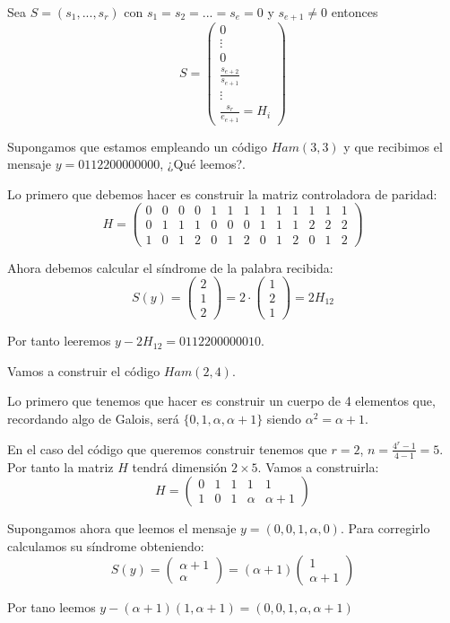 \obs Sea $S=(s_1,...,s_r)$ con $s_1=s_2=...=s_e=0$ y $s_{e+1} \neq 0$ entonces
\[S = \left( \begin{array}{c} 0 \\ \vdots \\ 0 \\ \frac{s_{e+2}}{s_{e+1}} \\ \vdots \\ \frac{s_{r}}{e_{e+1}}=H_i\end{array}\right)\]

\begin{example}
Supongamos que estamos empleando un código $Ham(3,3)$ y que recibimos el mensaje $y=0112200000000$, ¿Qué leemos?.

Lo primero que debemos hacer es construir la matriz controladora de paridad:
\[H = \left(\begin{array}{ccccccccccccc}
0 & 0 & 0 & 0 & 1 & 1 & 1 & 1 & 1 & 1 & 1 & 1 & 1\\
0 & 1 & 1 & 1 & 0 & 0 & 0 & 1 & 1 & 1 & 2 & 2 & 2\\
1 & 0 & 1 & 2 & 0 & 1 & 2 & 0 & 1 & 2 & 0 & 1 & 2
\end{array}\right)\]

Ahora debemos calcular el síndrome de la palabra recibida:
\[S(y) = \left(\begin{array}{c} 2 \\ 1 \\ 2\end{array} \right) = 2 \cdot  \left(\begin{array}{c} 1 \\ 2 \\ 1\end{array} \right) = 2H_{12}\]

Por tanto leeremos $y-2H_{12}=0112200000010$.
\end{example}

\begin{example}
Vamos a construir el código $Ham(2,4)$.

Lo primero que tenemos que hacer es construir un cuerpo de 4 elementos que, recordando algo de Galois, será $\{0,1,α,α+1\}$ siendo $α^2=α+1$.

En el caso del código que queremos construir tenemos que $r=2$, $n=\frac{4^r-1}{4-1}=5$. Por tanto la matriz $H$ tendrá dimensión $2 \times 5$. Vamos a construirla:
\[H = \left(\begin{array}{ccccc}
0 & 1 & 1 & 1 & 1\\
1 & 0 & 1 & α & α+1
\end{array} \right)\]

Supongamos ahora que leemos el mensaje $y=(0,0,1,α,0)$. Para corregirlo calculamos su síndrome obteniendo:
\[S(y) =  \left(\begin{array}{c} α+1 \\ α\end{array} \right)=(α+1) \left(\begin{array}{c} 1 \\ α+1\end{array} \right)\]

Por tano leemos $y-(α+1)(1,α+1) = (0,0,1,α,α+1)$
\end{example}